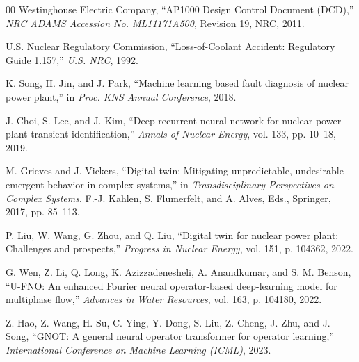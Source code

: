 \documentclass[conference]{IEEEtran}
\begin{document}
\begin{thebibliography}{00}
Westinghouse Electric Company,
``AP1000 Design Control Document (DCD),''
\textit{NRC ADAMS Accession No. ML11171A500}, Revision 19, NRC, 2011.

U.S. Nuclear Regulatory Commission,
``Loss-of-Coolant Accident: Regulatory Guide 1.157,''
\textit{U.S. NRC}, 1992.

K. Song, H. Jin, and J. Park,
``Machine learning based fault diagnosis of nuclear power plant,''
in \textit{Proc. KNS Annual Conference}, 2018.

J. Choi, S. Lee, and J. Kim,
``Deep recurrent neural network for nuclear power plant transient identification,''
\textit{Annals of Nuclear Energy}, vol. 133, pp. 10--18, 2019.

M. Grieves and J. Vickers,
``Digital twin: Mitigating unpredictable, undesirable emergent behavior in complex systems,''
in \textit{Transdisciplinary Perspectives on Complex Systems}, F.-J. Kahlen, S. Flumerfelt, and A. Alves, Eds., Springer, 2017, pp. 85--113.

P. Liu, W. Wang, G. Zhou, and Q. Liu,
``Digital twin for nuclear power plant: Challenges and prospects,''
\textit{Progress in Nuclear Energy}, vol. 151, p. 104362, 2022.

G. Wen, Z. Li, Q. Long, K. Azizzadenesheli, A. Anandkumar, and S. M. Benson,
``U-FNO: An enhanced Fourier neural operator-based deep-learning model for multiphase flow,''
\textit{Advances in Water Resources}, vol. 163, p. 104180, 2022.

Z. Hao, Z. Wang, H. Su, C. Ying, Y. Dong, S. Liu, Z. Cheng, J. Zhu, and J. Song,
``GNOT: A general neural operator transformer for operator learning,''
\textit{International Conference on Machine Learning (ICML)}, 2023.

\end{thebibliography}
\end{document}
